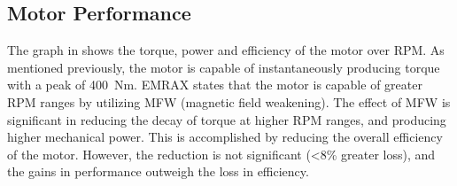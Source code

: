 \documentclass[main.tex]{subfiles}
\begin{document}
    \subsection{Motor Performance}
    The graph in  shows the torque, power and efficiency of the motor over RPM. As mentioned previously, the motor is capable of instantaneously producing torque with a peak of \SI{400}{Nm}. EMRAX states that the motor is capable of greater RPM ranges by utilizing MFW (magnetic field weakening). The effect of MFW is significant in reducing the decay of torque at higher RPM ranges, and producing higher mechanical power. This is accomplished by reducing the overall efficiency of the motor. However, the reduction is not significant (\textless8\% greater loss), and the gains in performance outweigh the loss in efficiency.\\
\end{document}
